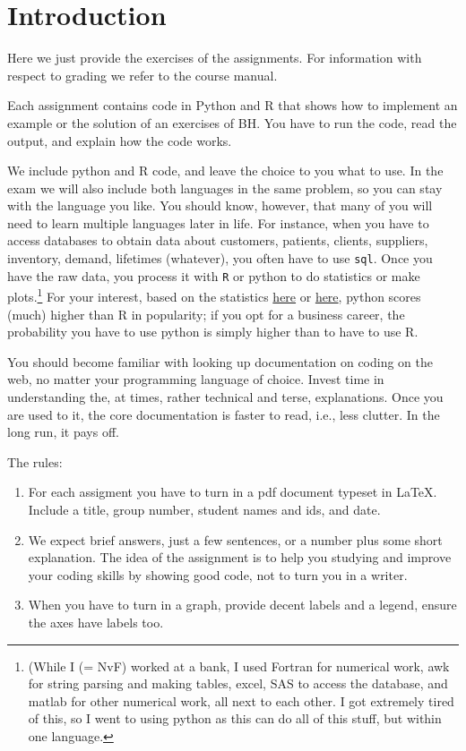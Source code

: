 \section*{Introduction}

Here we just provide the exercises of the assignments.  For information with respect to grading we refer to the  course manual.

Each assignment contains code in Python and R that shows how to implement an example or the solution of an exercises of BH. You have to run the code, read the output, and explain how the code works.

We include python and R code, and leave the choice to you what to use.
In the exam we will also include both languages in the same problem, so you can stay with the language you like.
You should know, however, that many of you will need to learn multiple languages later in life.
For instance, when you have to access databases to obtain data about customers, patients, clients, suppliers, inventory, demand, lifetimes (whatever), you often have to use \texttt{sql}.
Once you have the raw data, you process it with \texttt{R} or python to do statistics or make plots.\footnote{(While I (= NvF) worked at a bank, I used Fortran for numerical work, awk for string parsing and making tables, excel, SAS to access the database, and matlab for other numerical work, all next to each other.
I got extremely tired of this, so I went to using python as this can do all of this stuff, but within one language.}
For your interest, based on the statistics \href{https://www.tiobe.com/tiobe-index/}{here} or \href{https://www.northeastern.edu/graduate/blog/most-popular-programming-languages/}{here}, python scores (much) higher than R in popularity; if you opt for a business career, the probability you have to use python is simply higher than to have to use R.

You should become familiar with looking up documentation on coding on the web, no matter your programming language of choice. Invest time in understanding the, at times, rather technical and terse, explanations.  Once you are used to it, the core documentation is faster to read, i.e., less clutter. In the long run, it pays off.



The rules:
\begin{enumerate}
\item For each assigment you have to turn in a pdf document typeset in \LaTeX{}. Include a title, group number, student names and ids, and date.
\item We expect brief answers, just a few sentences, or a number plus some short explanation. The idea of the assignment is to help you studying and improve your coding skills by showing good code, not to turn you in a writer.
\item When you have to turn in a graph, provide decent labels and a legend, ensure the axes have labels too.
\end{enumerate}
